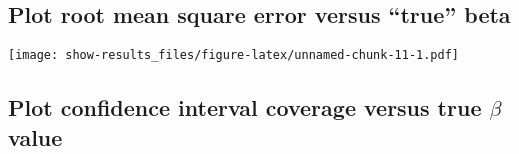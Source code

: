 \documentclass[11pt,]{article}
\newenvironment{Shaded}{\begin{snugshade}}{\end{snugshade}}
\newcommand{\KeywordTok}[1]{\textcolor[rgb]{0.13,0.29,0.53}{\textbf{{#1}}}}
\newcommand{\DataTypeTok}[1]{\textcolor[rgb]{0.13,0.29,0.53}{{#1}}}
\newcommand{\DecValTok}[1]{\textcolor[rgb]{0.00,0.00,0.81}{{#1}}}
\newcommand{\StringTok}[1]{\textcolor[rgb]{0.31,0.60,0.02}{{#1}}}
\newcommand{\CommentTok}[1]{\textcolor[rgb]{0.56,0.35,0.01}{\textit{{#1}}}}
\newcommand{\NormalTok}[1]{{#1}}
\begin{document}
\subsection{\texorpdfstring{Plot root mean square error versus ``true''
beta}{Plot root mean square error versus true beta}}\label{plot-root-mean-square-error-versus-true-beta}

\begin{Shaded}
\end{Shaded}

\texttt{[image: show-results\_files/figure-latex/unnamed-chunk-11-1.pdf]}

\subsection{\texorpdfstring{Plot confidence interval coverage versus
true \(\beta\)
value}{Plot confidence interval coverage versus true \textbackslash{}beta value}}\label{plot-confidence-interval-coverage-versus-true-beta-value}
\end{document}
